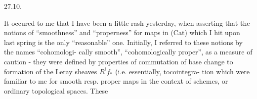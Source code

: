 27.10.

  It occured to me that I have been a little rash yesterday,
when asserting that the notions of ``smoothness'' and ``properness'' for
maps in (Cat) which I hit upon last spring is the only ``reasonable''
one. Initially, I referred to these notions by the names ``cohomologi-%
cally smooth'', ``cohomologically proper'', as a measure of caution -
they were defined by properties of commutation of base change to
formation of the Leray sheaves $R^if_*$ (i.e. essentially, tocointegra-%
tion\hand{),} which were familiar to me for smooth resp. proper maps in the
context of schemes, or ordinary topological spaces.  These


